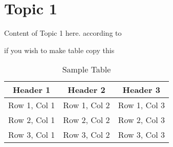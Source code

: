 \chapter{Topic 1}
Content of Topic 1 here. according to \cite{b1}

if you wish to make table copy this
\begin{table}[h]
    \centering
    \caption{Sample Table}
    \begin{tabular}{|c|c|c|}
        \hline
        \textbf{Header 1} & \textbf{Header 2} & \textbf{Header 3} \\ \hline
        Row 1, Col 1      & Row 1, Col 2      & Row 1, Col 3      \\ \hline
        Row 2, Col 1      & Row 2, Col 2      & Row 2, Col 3      \\ \hline
        Row 3, Col 1      & Row 3, Col 2      & Row 3, Col 3      \\ \hline
    \end{tabular}
    \label{tab:sample_table}
\end{table}
